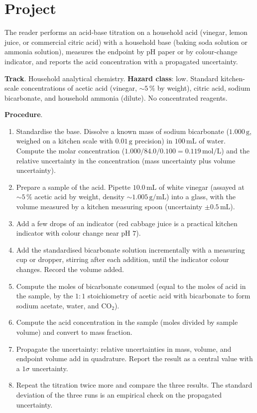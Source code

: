 \section{Project}

\begin{project}
The reader performs an acid-base titration on a household acid
(vinegar, lemon juice, or commercial citric acid) with a household
base (baking soda solution or ammonia solution), measures the
endpoint by pH paper or by colour-change indicator, and reports the
acid concentration with a propagated uncertainty.

\textbf{Track}. Household analytical chemistry.
\textbf{Hazard class}: low. Standard kitchen-scale concentrations of
acetic acid (vinegar, $\sim 5\,\%$ by weight), citric acid, sodium
bicarbonate, and household ammonia (dilute). No concentrated reagents.

\textbf{Procedure}.

\begin{enumerate}[leftmargin=*]
\item Standardise the base. Dissolve a known mass of sodium
  bicarbonate ($1.000\,\text{g}$, weighed on a kitchen scale with
  $0.01\,\text{g}$ precision) in $100\,\text{mL}$ of water. Compute
  the molar concentration ($1.000/84.0/0.100 = 0.119\,\text{mol}/
  \text{L}$) and the relative uncertainty in the concentration
  (mass uncertainty plus volume uncertainty).
\item Prepare a sample of the acid. Pipette $10.0\,\text{mL}$ of
  white vinegar (assayed at $\sim 5\,\%$ acetic acid by weight,
  density $\sim 1.005\,\text{g}/\text{mL}$) into a glass, with the
  volume measured by a kitchen measuring spoon (uncertainty $\pm 0.5\,
  \text{mL}$).
\item Add a few drops of an indicator (red cabbage juice is a
  practical kitchen indicator with colour change near pH $7$).
\item Add the standardised bicarbonate solution incrementally with a
  measuring cup or dropper, stirring after each addition, until the
  indicator colour changes. Record the volume added.
\item Compute the moles of bicarbonate consumed (equal to the moles of
  acid in the sample, by the $1{:}1$ stoichiometry of acetic acid
  with bicarbonate to form sodium acetate, water, and CO$_2$).
\item Compute the acid concentration in the sample (moles divided by
  sample volume) and convert to mass fraction.
\item Propagate the uncertainty: relative uncertainties in mass,
  volume, and endpoint volume add in quadrature. Report the result
  as a central value with a $1\sigma$ uncertainty.
\item Repeat the titration twice more and compare the three results.
  The standard deviation of the three runs is an empirical check on
  the propagated uncertainty.
\end{enumerate}


\end{project}
